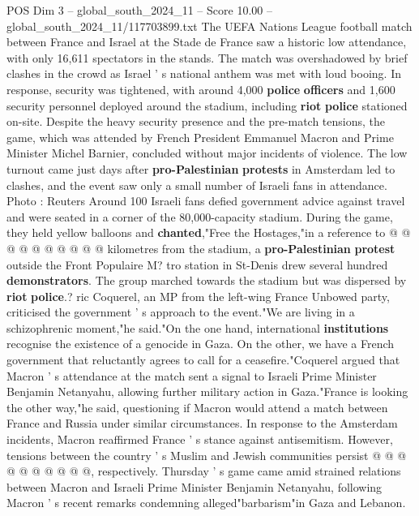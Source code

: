 \begin{textsample}{POS Dim 3 – global\_south\_2024\_11 – Score 10.00 – global\_south\_2024\_11/117703899.txt}  \label{ex:f3_pos_323}
The UEFA Nations League football match between France and Israel at the Stade de France saw a historic low attendance, with only 16,611 spectators in the stands.
The match was overshadowed by brief clashes in the crowd as Israel ' s national anthem was met with loud booing.
In response, security was tightened, with around 4,000 \textbf{police} \textbf{officers} and 1,600 security personnel deployed around the stadium, including \textbf{riot} \textbf{police} stationed on-site.
Despite the heavy security presence and the pre-match tensions, the game, which was attended by French President Emmanuel Macron and Prime Minister Michel Barnier, concluded without major incidents of violence.
The low turnout came just days after \textbf{pro-Palestinian} \textbf{protests} in Amsterdam led to clashes, and the event saw only a small number of Israeli fans in attendance.
Photo : Reuters Around 100 Israeli fans defied government advice against travel and were seated in a corner of the 80,000-capacity stadium.
During the game, they held yellow balloons and \textbf{chanted},"Free the Hostages,"in a reference to @ @ @ @ @ @ @ @ @ @ kilometres from the stadium, a \textbf{pro-Palestinian} \textbf{protest} outside the Front Populaire M? tro station in St-Denis drew several hundred \textbf{demonstrators}.
The group marched towards the stadium but was dispersed by \textbf{riot} \textbf{police}.? ric Coquerel, an MP from the left-wing France Unbowed party, criticised the government ' s approach to the event."We are living in a schizophrenic moment,"he said."On the one hand, international \textbf{institutions} recognise the existence of a genocide in Gaza.
On the other, we have a French government that reluctantly agrees to call for a ceasefire."Coquerel argued that Macron ' s attendance at the match sent a signal to Israeli Prime Minister Benjamin Netanyahu, allowing further military action in Gaza."France is looking the other way,"he said, questioning if Macron would attend a match between France and Russia under similar circumstances.
In response to the Amsterdam incidents, Macron reaffirmed France ' s stance against antisemitism.
However, tensions between the country ' s Muslim and Jewish communities persist @ @ @ @ @ @ @ @ @ @, respectively.
Thursday ' s game came amid strained relations between Macron and Israeli Prime Minister Benjamin Netanyahu, following Macron ' s recent remarks condemning alleged"barbarism"in Gaza and Lebanon.

\end{textsample}
